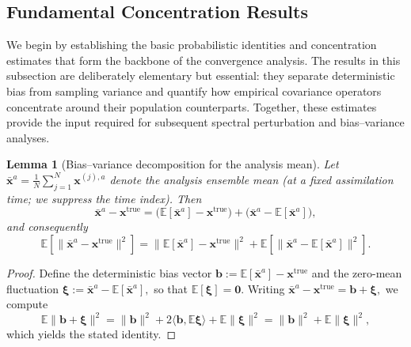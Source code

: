 \documentclass[11pt,a4paper]{article}
\newtheorem{lemma}{Lemma}
\begin{document}

\subsection{Fundamental Concentration Results}
\label{subsec:fundamental_concentration}

We begin by establishing the basic probabilistic identities and concentration estimates that form the backbone of the convergence analysis. The results in this subsection are deliberately elementary but essential: they separate deterministic bias from sampling variance and quantify how empirical covariance operators concentrate around their population counterparts. Together, these estimates provide the input required for subsequent spectral perturbation and bias--variance analyses.

\begin{lemma}[Bias--variance decomposition for the analysis mean]
\label{lem:mean_error_decomp}
Let
\(
\bar{\mathbf{x}}^{a}=\frac{1}{N}\sum_{j=1}^N\mathbf{x}^{(j),a}
\)
denote the analysis ensemble mean (at a fixed assimilation time; we suppress the time index). Then
\begin{equation}
\bar{\mathbf{x}}^{a}-\mathbf{x}^{\mathrm{true}}
=
\bigl(\mathbb{E}[\bar{\mathbf{x}}^{a}]-\mathbf{x}^{\mathrm{true}}\bigr)
+
\bigl(\bar{\mathbf{x}}^{a}-\mathbb{E}[\bar{\mathbf{x}}^{a}]\bigr),
\end{equation}
and consequently
\begin{equation}
\mathbb{E}\!\left[\|\bar{\mathbf{x}}^{a}-\mathbf{x}^{\mathrm{true}}\|^2\right]
=
\|\mathbb{E}[\bar{\mathbf{x}}^{a}]-\mathbf{x}^{\mathrm{true}}\|^2
+
\mathbb{E}\!\left[\|\bar{\mathbf{x}}^{a}-\mathbb{E}[\bar{\mathbf{x}}^{a}]\|^2\right].
\end{equation}
\end{lemma}

\begin{proof}
Define the deterministic bias vector
\(
\mathbf{b}:=\mathbb{E}[\bar{\mathbf{x}}^{a}]-\mathbf{x}^{\mathrm{true}}
\)
	and the zero-mean fluctuation
	\(
	\boldsymbol{\xi}:=\bar{\mathbf{x}}^{a}-\mathbb{E}[\bar{\mathbf{x}}^{a}],
	\)
	so that $\mathbb{E}[\boldsymbol{\xi}]=\mathbf{0}$. Writing
	\(
	\bar{\mathbf{x}}^{a}-\mathbf{x}^{\mathrm{true}}=\mathbf{b}+\boldsymbol{\xi},
	\)
	we compute
\begin{equation}
	\mathbb{E}\|\mathbf{b}+\boldsymbol{\xi}\|^2
	=
	\|\mathbf{b}\|^2
	+
	2\langle \mathbf{b},\mathbb{E}\boldsymbol{\xi}\rangle
	+
	\mathbb{E}\|\boldsymbol{\xi}\|^2
	=
	\|\mathbf{b}\|^2+\mathbb{E}\|\boldsymbol{\xi}\|^2,
\end{equation}
	which yields the stated identity.
	\end{proof}
\end{document}
